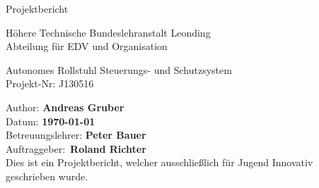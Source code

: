 \cfoot{}
\begin{titlepage}
\thispagestyle{fancy}

\begin{center}

\vspace*{8em}

{\LARGE Projektbericht}

\vspace{2em}

{\large H\"ohere Technische Bundeslehranstalt Leonding \\[.5em]
Abteilung f\"ur EDV und Organisation}

\vspace{8em}

{\fontsize{17}{20}\selectfont Autonomes Rollstuhl Steuerungs- und Schutzsystem \\ Projekt-Nr: J130516}
\end{center}

\vspace{14em}

Author: {\bf Andreas Gruber} \\

Datum: {\bf \today} \\

Betreuungslehrer: {\bf Peter Bauer}\\

Auftraggeber:~{\bf Roland Richter}\\

{\small Dies ist ein Projektbericht, welcher ausschließlich für Jugend Innovativ geschrieben wurde.}
\end{titlepage}